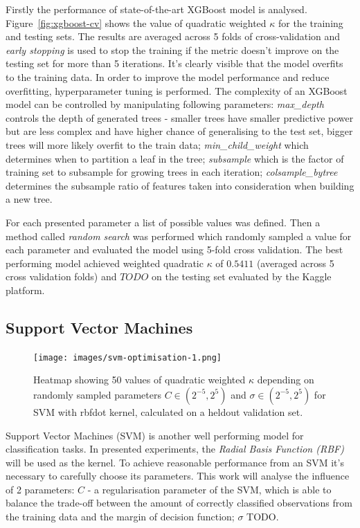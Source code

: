 \documentclass[fleqn,10pt]{SelfArx} %
\begin{document}
Firstly the performance of state-of-the-art XGBoost model is analysed.
Figure~\ref{fig:xgboost-cv} shows the value of quadratic weighted $\kappa$ for the training and testing sets.
The results are averaged across 5 folds of cross-validation and \textit{early stopping} is used to stop the training if the metric doesn't improve on the testing set for more than 5 iterations.
It's clearly visible that the model overfits to the training data.
In order to improve the model performance and reduce overfitting, hyperparameter tuning is performed.
The complexity of an XGBoost model can be controlled by manipulating following parameters: \textit{max\_depth} controls the depth of generated trees - smaller trees have smaller predictive power but are less complex and have higher chance of generalising to the test set, bigger trees will more likely overfit to the train data; \textit{min\_child\_weight} which determines when to partition a leaf in the tree; \textit{subsample} which is the factor of training set to subsample for growing trees in each iteration; \textit{colsample\_bytree} determines the subsample ratio of features taken into consideration when building a new tree.

For each presented parameter a list of possible values was defined.
Then a method called \textit{random search} was performed which randomly sampled a value for each parameter and evaluated the model using 5-fold cross validation.
The best performing model achieved weighted quadratic $\kappa$ of $0.5411$ (averaged across 5 cross validation folds) and $TODO$ on the testing set evaluated by the Kaggle platform.

\subsection{Support Vector Machines}

\begin{figure}
    \centering
    \texttt{[image: images/svm-optimisation-1.png]}
    \caption{Heatmap showing 50 values of quadratic weighted $\kappa$ depending on randomly sampled parameters $C \in (2^{-5}, 2^5)$ and $\sigma \in (2^{-5}, 2^5)$ for SVM with rbfdot kernel, calculated on a heldout validation set.}
    \label{fig:svm-optimisation-1}
\end{figure}

Support Vector Machines (SVM) is another well performing model for classification tasks.
In presented experiments, the \textit{Radial Basis Function (RBF)} will be used as the kernel.
To achieve reasonable performance from an SVM it's necessary to carefully choose its parameters.
This work will analyse the influence of 2 parameters: $C$ - a regularisation parameter of the SVM, which is able to balance the trade-off between the amount of correctly classified observations from the training data and the margin of decision function;
$\sigma$ TODO.
\end{document}
